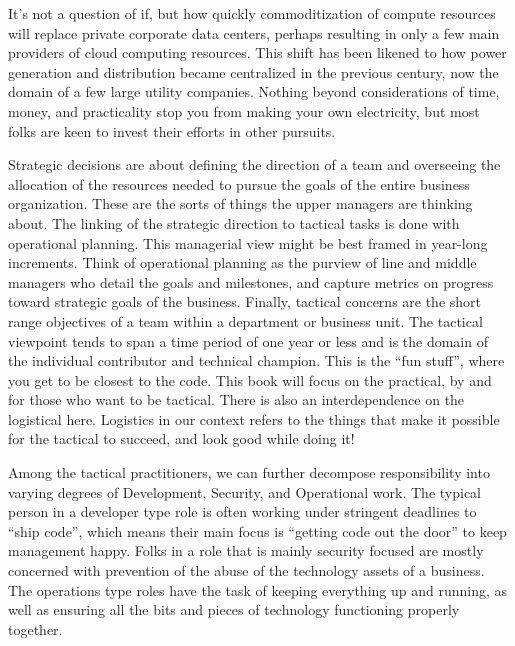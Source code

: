 \justifying
It's not a question of if, but how quickly commoditization of compute resources
will replace private corporate data centers, perhaps resulting in only a
few main providers of cloud computing resources. This shift has been likened
to how power generation and distribution became centralized
in the previous century, now the domain of a few large utility companies.
Nothing beyond considerations of time, money, and practicality stop you
from making your own electricity, but most folks are keen to invest their
efforts in other pursuits.

\justifying
Strategic decisions are about defining the direction of a team and overseeing
the allocation of the resources needed to pursue the goals of the entire
business organization. These are the sorts of things the upper managers are
thinking about. The linking of the strategic direction to tactical tasks is
done with operational planning. This managerial view might be best framed in
year-long increments. Think of operational planning as the purview of line
and middle managers who detail the goals and milestones, and capture metrics
on progress toward strategic goals of the business. Finally, tactical concerns
are the short range objectives of a team within a department or business unit.
The tactical viewpoint tends to span a time period of one year or less and is
the domain of the individual contributor and technical champion. This is the
``fun stuff'', where you get to be closest to the code. This book will focus
on the practical, by and for those who want to be tactical. There is also
an interdependence on the logistical here. Logistics in our context refers to
the things that make it possible for the tactical to succeed, and look good
while doing it!

\justifying
Among the tactical practitioners, we can further decompose responsibility into
varying degrees of Development, Security, and Operational work. The typical
person in a developer type role is often working under stringent deadlines to
``ship code'', which means their main focus is ``getting code out the door'' to
keep management happy. Folks in a role that is mainly security focused are mostly
concerned with prevention of the abuse of the technology assets of a business. The
operations type roles have the task of keeping everything up and running, as well as
ensuring all the bits and pieces of technology functioning properly together.

